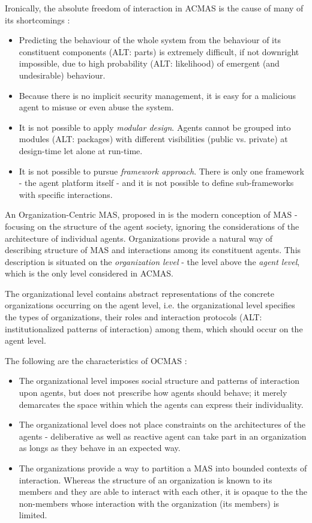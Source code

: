 Ironically, the absolute freedom of interaction in ACMAS is the cause of many of its shortcomings \cite{Ferber03}:
\begin{itemize}
	\item Predicting the behaviour of the whole system from the behaviour of its constituent components (ALT: parts) is extremely difficult, if not downright impossible, due to high probability (ALT: likelihood) of emergent (and undesirable) behaviour.
	\item Because there is no implicit security management, it is easy for a malicious agent to misuse or even abuse the system.
	\item It is not possible to apply \textit{modular design}. Agents cannot be grouped into modules (ALT: packages) with different visibilities (public vs. private) at design-time let alone at run-time.
	\item It is not possible to pursue \textit{framework approach}. There is only one framework - the agent platform itself - and it is not possible to define sub-frameworks with specific interactions.
\end{itemize}

An Organization-Centric MAS, proposed in \cite{Ferber03} is the modern conception of MAS - focusing on the structure of the agent society, ignoring the considerations of the architecture of individual agents.
Organizations provide a natural way of describing structure of MAS and interactions among its constituent agents.
This description is situated on the \textit{organization level} - the level above the \textit{agent level}, which is the only level considered in ACMAS.

The organizational level contains abstract representations of the concrete organizations occurring on the agent level, i.e. the organizational level specifies the types of organizations, their roles and interaction protocols (ALT: institutionalized patterns of interaction) among them, which should occur on the agent level.

The following are the characteristics of OCMAS \cite{Ferber03}:
\begin{itemize}
	\item The organizational level imposes social structure and patterns of interaction upon agents, but does not prescribe how agents should behave; it merely demarcates the space within which the agents can express their individuality.
	\item The organizational level does not place constraints on the architectures of the agents - deliberative as well as reactive agent can take part in an organization as longs as they behave in an expected way.
	\item The organizations provide a way to partition a MAS into bounded contexts of interaction.
	Whereas the structure of an organization is known to its members and they are able to interact with each other, it is opaque to the the non-members whose interaction with the organization (its members) is limited.
\end{itemize}

